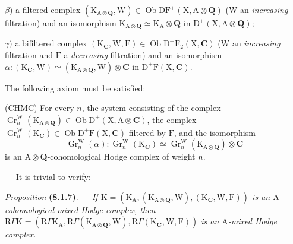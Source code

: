 \documentclass[11pt,leqno]{article}
\newcommand{\Page}[1]{\ifvmode\noindent\else\unskip\ \fi{\footnotesize\textcolor{gray}{[p.\,#1]}}\ \ignorespaces}
\begin{document}
\(\beta)\) a filtered complex \((\mathrm{K}_{\mathrm{A}\otimes\mathbf{Q}},\mathrm{W})\in\operatorname{Ob}\mathrm{DF}^{+}(\mathrm{X},\mathrm{A}\otimes\mathbf{Q})\) (\(\mathrm{W}\) an \textit{increasing} filtration) and an isomorphism \(\mathrm{K}_{\mathrm{A}\otimes\mathbf{Q}}\simeq\mathrm{K}_{\mathrm{A}}\otimes\mathbf{Q}\) in \(\mathrm{D}^{+}(\mathrm{X},\mathrm{A}\otimes\mathbf{Q})\);

\(\gamma)\) a bifiltered complex \((\mathrm{K}_{\mathbf{C}},\mathrm{W},\mathrm{F})\in\operatorname{Ob}\mathrm{D}^{+}\mathrm{F}_{2}(\mathrm{X},\mathbf{C})\) (\(\mathrm{W}\) an \textit{increasing} filtration and \(\mathrm{F}\) a \textit{decreasing} filtration) and an isomorphism \(\alpha:(\mathrm{K}_{\mathbf{C}},\mathrm{W})\simeq(\mathrm{K}_{\mathrm{A}\otimes\mathbf{Q}},\mathrm{W})\otimes\mathbf{C}\) in \(\mathrm{D}^{+}\mathrm{F}(\mathrm{X},\mathbf{C})\).

The following axiom must be satisfied:

(CHMC) For every \(n\), the system consisting of the complex \(\operatorname{Gr}_{n}^{\mathrm{W}}(\mathrm{K}_{\mathrm{A}\otimes\mathbf{Q}})\in\operatorname{Ob}\mathrm{D}^{+}(\mathrm{X},\mathrm{A}\otimes\mathbf{C})\), the complex \(\operatorname{Gr}_{n}^{\mathrm{W}}(\mathrm{K}_{\mathbf{C}})\in\operatorname{Ob}\mathrm{D}^{+}\mathrm{F}(\mathrm{X},\mathbf{C})\) filtered by \(\mathrm{F}\), and the isomorphism
\[
\operatorname{Gr}_{n}^{\mathrm{W}}(\alpha):
\operatorname{Gr}_{n}^{\mathrm{W}}(\mathrm{K}_{\mathbf{C}})
\simeq
\operatorname{Gr}_{n}^{\mathrm{W}}(\mathrm{K}_{\mathrm{A}\otimes\mathbf{Q}})\otimes\mathbf{C}
\]
is an \(\mathrm{A}\otimes\mathbf{Q}\)-cohomological Hodge complex of weight \(n\).

\Page{30}
It is trivial to verify:

\textit{Proposition} \textbf{(8.1.7)}. — \textit{If \(\mathrm{K}=(\mathrm{K}_{\mathrm{A}},(\mathrm{K}_{\mathrm{A}\otimes\mathbf{Q}},\mathrm{W}),(\mathrm{K}_{\mathbf{C}},\mathrm{W},\mathrm{F}))\) is an \(\mathrm{A}\)-cohomological mixed Hodge complex, then \(\mathrm{R}\Gamma\mathrm{K}=(\mathrm{R}\Gamma\mathrm{K}_{\mathrm{A}},\mathrm{R}\Gamma(\mathrm{K}_{\mathrm{A}\otimes\mathbf{Q}},\mathrm{W}),\mathrm{R}\Gamma(\mathrm{K}_{\mathbf{C}},\mathrm{W},\mathrm{F}))\) is an \(\mathrm{A}\)-mixed Hodge complex.}
\end{document}
